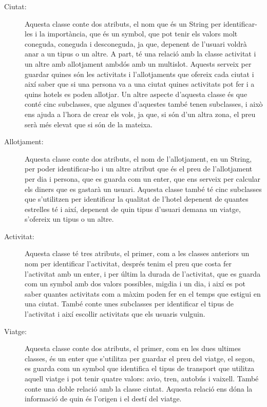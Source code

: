 \documentclass[11pt,a4paper]{article}
\begin{document}
\begin{description}
\item[Ciutat:]Aquesta classe conte dos atributs, el nom que és un String per identificar-les i la importància, que és un symbol, que pot tenir els valors molt coneguda, coneguda i desconeguda, ja que, depenent de l'usuari voldrà anar a un tipus o un altre.
A part, té una relació amb la classe activitat i un altre amb allotjament ambdós amb un multislot. Aquests serveix per guardar quines són les activitats i l'allotjaments que ofereix cada ciutat i així saber que si una persona va a una ciutat quines activitats pot fer i a quins hotels es poden allotjar.
Un altre aspecte d'aquesta classe és que conté cinc subclasses, que algunes d'aquestes també tenen subclasses, i això ens ajuda a l'hora de crear els vols, ja que, si són d'un altra zona, el preu serà més elevat que si són de la mateixa.

\item[Allotjament:] Aquesta classe conte dos atributs, el nom de l'allotjament, en un String, per poder identificar-ho i un altre atribut que és el preu de l'allotjament per dia i persona, que es guarda com un enter, que ens serveix per calcular els diners que es gastarà un usuari.
Aquesta classe també té cinc subclasses que s'utilitzen per identificar la qualitat de l'hotel depenent de quantes estrelles té i així, depenent de quin tipus d'usuari demana un viatge, s'ofereix un tipus o un altre.

\item[Activitat:] Aquesta classe té tres atributs, el primer, com a les classes anteriors un nom per identificar l'activitat, després tenim el preu que costa fer l'activitat amb un enter, i per últim la durada de l'activitat, que es guarda com un symbol amb dos valors possibles, migdia i un dia, i així es pot saber quantes activitats com a màxim poden fer en el temps que estigui en una ciutat.
També conte unes subclasses per identificar el tipus de l'activitat i així escollir activitats que els usuaris vulguin.


\item[Viatge:] Aquesta classe conte dos atributs, el primer, com en les dues ultimes classes, és un enter que s'utilitza per guardar el preu del viatge, el segon, es guarda com un symbol que identifica el tipus de transport que utilitza aquell viatge i pot tenir quatre valors: avio, tren, autobús i vaixell.
També conte una doble relació amb la classe ciutat. Aquesta relació ens dóna la informació de quin és l'origen i el destí del viatge.
\end{description}
\end{document}
